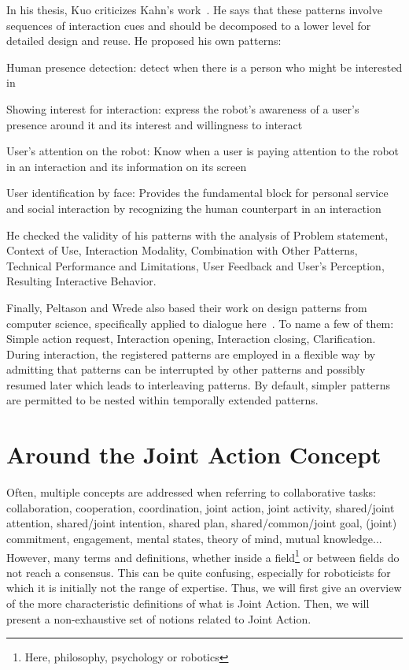 \documentclass[a4paper,11pt,twoside]{StyleThese}
\begin{document}
In his thesis, Kuo criticizes Kahn’s work~\cite{kuo_2012_designing}. He says that these patterns involve sequences of interaction cues and should be decomposed to a lower level for detailed design and reuse. He proposed his own patterns:
\begin{bulletList}
	\item Human presence detection: detect when there is a person who might be interested in
	\item Showing interest for interaction: express the robot’s awareness of a user’s presence around it and its interest and willingness to interact
	\item User’s attention on the robot: Know when a user is paying attention to the robot in an interaction and its information on its screen
	\item User identification by face: Provides the fundamental block for personal service and social interaction by recognizing the human counterpart in an interaction
\end{bulletList}
He checked the validity of his patterns with the analysis of Problem statement, Context of Use, Interaction Modality, Combination with Other Patterns, Technical Performance and Limitations, User Feedback and User’s Perception, Resulting Interactive Behavior.

Finally, Peltason and Wrede also based their work on design patterns from computer science, specifically applied to dialogue here~\cite{peltason_2010_pamini}. To name a few of them: Simple action request, Interaction opening, Interaction closing, Clarification. During interaction, the registered patterns are employed in a flexible way by admitting that patterns can be interrupted by other patterns and possibly resumed later which leads to interleaving patterns. By default, simpler patterns are permitted to be nested within temporally extended patterns.

\section{Around the Joint Action Concept}\label{chap1:sec:ja}
Often, multiple concepts are addressed when referring to collaborative tasks: collaboration, cooperation, coordination, joint action, joint activity, shared/joint attention, shared/joint intention, shared plan, shared/common/joint goal, (joint) commitment, engagement, mental states, theory of mind, mutual knowledge... However, many terms and definitions, whether inside a field\footnote{Here, philosophy, psychology or robotics} or between fields do not reach a consensus. This can be quite confusing, especially for roboticists for which it is initially not the range of expertise. Thus, we will first give an overview of the more characteristic definitions of what is Joint Action. Then, we will present a non-exhaustive set of notions related to Joint Action. 
\end{document}
